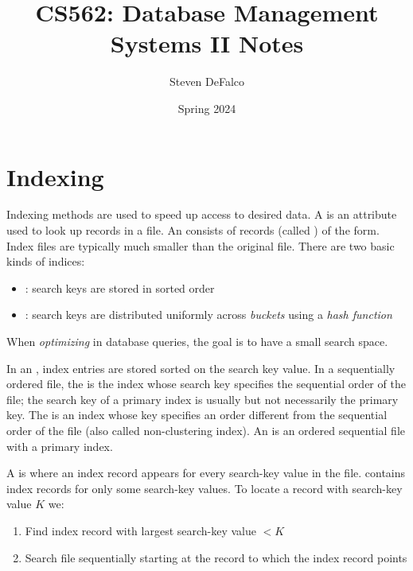 \documentclass{article}
\title{CS562: Database Management Systems II Notes}
\author{Steven DeFalco}
\date{Spring 2024}
\begin{document}
\maketitle
\tableofcontents
\newpage


\section{Indexing}

Indexing methods are used to speed up access to desired data. A  is an attribute used to look up records in a file. An  consists of records (called ) of the form. Index files are typically much smaller than the original file. There are two basic kinds of indices:
\begin{itemize}
  \item {}: search keys are stored in sorted order 
  \item {}: search keys are distributed uniformly across \emph{buckets} using a \emph{hash function}
\end{itemize}

\begin{remark}
  When \emph{optimizing} in database queries, the goal is to have a small search space. 
\end{remark}

In an , index entries are stored sorted on the search key value. In a sequentially ordered file, the  is the index whose search key specifies the sequential order of the file; the search key of a primary index is usually but not necessarily the primary key. The  is an index whose key specifies an order different from the sequential order of the file (also called non-clustering index). An  is an ordered sequential file with a primary index. 

A  is where an index record appears for every search-key value in the file.  contains index records for only some search-key values. To locate a record with search-key value $K$ we: 
\begin{enumerate}
  \item Find index record with largest search-key value $<K$ 
  \item Search file sequentially starting at the record to which the index record points
\end{enumerate}
\end{document}
